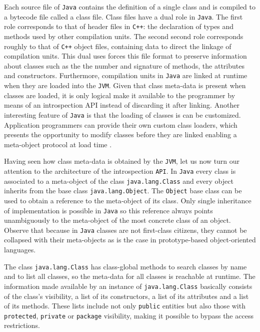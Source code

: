 Each source file of \texttt{Java} contains the definition of a single class and is compiled to a bytecode file called a class file.
Class files have a dual role in \texttt{Java}. The first role corresponds to that of header files in \texttt{C++}: the
declaration of types and methods used by other compilation units. The second second role corresponds roughly to that of
\texttt{C++} object files, containing data to direct the linkage of compilation units. This dual uses forces this file format to
preserve information about classes such as the the number and signature of methods, the attributes and constructors.
Furthermore, compilation units in \texttt{Java} are linked at runtime when they are loaded into the \texttt{JVM}. Given that
class meta-data is present when classes are loaded, it is only logical make it available to the programmer by means
of an introspection API instead of discarding it after linking. Another interesting feature of \texttt{Java} is that the loading
of classes is can be customized. Application programmers can provide their own custom class loaders, which presents the
opportunity to modify classes before they are linked enabling a meta-object protocol at load time \cite{Chiba2000}.

Having seen how class meta-data is obtained by the \texttt{JVM}, let us now turn our attention to the architecture of the
introspection \texttt{API}. In \texttt{Java} every class is associated to a meta-object of the class \texttt{java.lang.Class} and every object
inherits from the base class \texttt{java.lang.Object}. The \texttt{Object} base class can be used to obtain a reference to the meta-object of
its class. Only single inheritance of implementation is possible in \texttt{Java} so this reference always points unambiguously to the
meta-object of the most concrete class of an object. Observe that because in \texttt{Java} classes are not first-class citizens, they
cannot be collapsed with their meta-objects as is the case in prototype-based object-oriented languages.

The class \texttt{java.lang.Class} has class-global methods to search classes by name and to list all classes, so the meta-data for all
classes is reachable at runtime. The information made available by an instance of \texttt{java.lang.Class} basically consists of the
class's visibility, a list of its constructors, a list of its attributes and a list of its methods. These lists include not only
\texttt{public} entities but also those with \texttt{protected}, \texttt{private} or \texttt{package} visibility, making it
possible to bypass the access restrictions.

